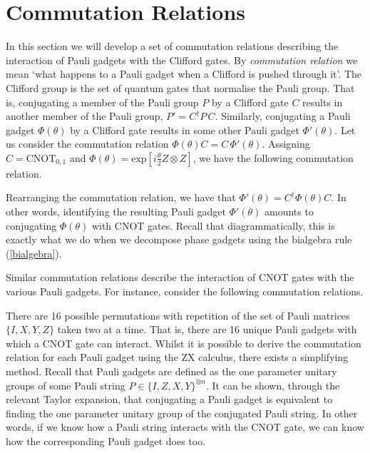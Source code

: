 \section{Commutation Relations}

In this section we will develop a set of commutation relations describing the interaction of Pauli gadgets with the Clifford gates. By \textit{commutation relation} we mean `what happens to a Pauli gadget when a Clifford is pushed through it'. The Clifford group is the set of quantum gates that normalise the Pauli group. That is, conjugating a member of the Pauli group $P$ by a Clifford gate $C$ results in another member of the Pauli group, $P' = C^\dagger P \, C$. Similarly, conjugating a Pauli gadget $\Phi(\theta)$ by a Clifford gate results in some other Pauli gadget $\Phi'(\theta)$. Let us consider the commutation relation $\Phi(\theta) C = C \, \Phi'(\theta)$. Assigning $C = \text{CNOT}_{0, 1}$ and $\Phi(\theta) = \text{exp} \left[ i\frac{\theta}{2} Z \otimes Z \right]$, we have the following commutation relation.


Rearranging the commutation relation, we have that $\Phi'(\theta) = C^\dagger \Phi(\theta) C$. In other words, identifying the resulting Pauli gadget $\Phi'(\theta)$ amounts to conjugating $\Phi(\theta)$ with CNOT gates. Recall that diagrammatically, this is exactly what we do when we decompose phase gadgets using the bialgebra rule (\ref{bialgebra}).


Similar commutation relations describe the interaction of CNOT gates with the various Pauli gadgets. For instance, consider the following commutation relations.



There are 16 possible permutations with repetition of the set of Pauli matrices $\{I, X, Y, Z\}$ taken two at a time. That is, there are 16 unique Pauli gadgets with which a CNOT gate can interact. Whilst it is possible to derive the commutation relation for each Pauli gadget using the ZX calculus, there exists a simplifying method. Recall that Pauli gadgets are defined as the one parameter unitary groups of some Pauli string $P \in \{I, Z, X, Y\}^{\otimes n}$. It can be shown, through the relevant Taylor expansion, that conjugating a Pauli gadget is equivalent to finding the one parameter unitary group of the conjugated Pauli string. In other words, if we know how a Pauli string interacts with the CNOT gate, we can know how the corresponding Pauli gadget does too.

